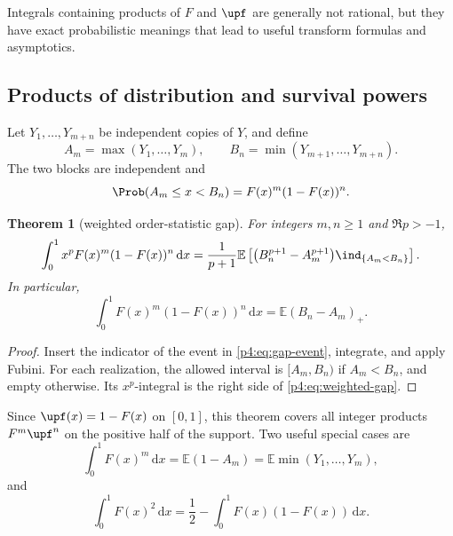 \documentclass[11pt,oneside]{article}
\newtheorem{theorem}{Theorem}[section]
\theoremstyle{definition}
\theoremstyle{remark}
\newcommand{\F}{F}
\newcommand{\E}{\mathbb E}
\newcommand{\dd}{\,\mathrm d}
\newcommand{\1}{\mathbf 1}
\begin{document}
Integrals containing products of \(\F\) and \(\upf\) are generally not rational, but
they have exact probabilistic meanings that lead to useful transform formulas and
asymptotics.

\subsection{Products of distribution and survival powers}

Let \(Y_1,\ldots,Y_{m+n}\) be independent copies of \(Y\), and define
\begin{equation}\label{p4:eq:Amax-Bmin}
 A_m=\max(Y_1,\ldots,Y_m),
 \qquad
 B_n=\min(Y_{m+1},\ldots,Y_{m+n}).
\end{equation}
The two blocks are independent and
\begin{equation}\label{p4:eq:gap-event}
 \Prob(A_m\le x<B_n)=\F(x)^m(1-\F(x))^n.
\end{equation}

\begin{theorem}[weighted order-statistic gap]\label{p4:thm:order-gap}
For integers \(m,n\ge1\) and \(\Re p>-1\),
\begin{equation}\label{p4:eq:weighted-gap}
 \int_0^1x^p\F(x)^m(1-\F(x))^n\dd x
 =\frac1{p+1}\E\left[
 \bigl(B_n^{p+1}-A_m^{p+1}\bigr)\ind_{\{A_m<B_n\}}
 \right].
\end{equation}
In particular,
\begin{equation}\label{p4:eq:gap-unweighted}
 \int_0^1\F(x)^m(1-\F(x))^n\dd x
 =\E(B_n-A_m)_+.
\end{equation}
\end{theorem}

\begin{proof}
Insert the indicator of the event in \cref{p4:eq:gap-event}, integrate, and apply Fubini.
For each realization, the allowed interval is \([A_m,B_n)\) if \(A_m<B_n\), and empty
otherwise.  Its \(x^p\)-integral is the right side of \cref{p4:eq:weighted-gap}.
\end{proof}

Since \(\upf(x)=1-\F(x)\) on \([0,1]\), this theorem covers all integer products
\(\F^m\upf^n\) on the positive half of the support.  Two useful special cases are
\begin{equation}\label{p4:eq:Fm-order}
 \int_0^1\F(x)^m\dd x=\E(1-A_m)=\E\min(Y_1,\ldots,Y_m),
\end{equation}
and
\begin{equation}\label{p4:eq:F2-gini-relation}
 \int_0^1\F(x)^2\dd x
 =\frac12-\int_0^1\F(x)(1-\F(x))\dd x.
\end{equation}
\end{document}
